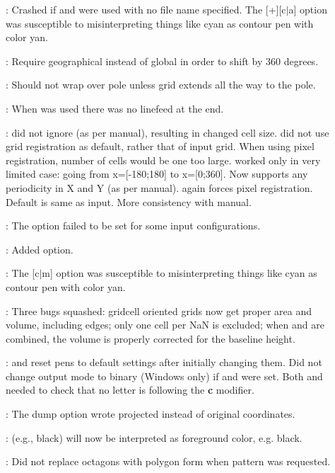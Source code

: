 \begin{description}
\item []: Crashed if  and  were used with no file name specified.
The [+][c$|$a] option was susceptible to misinterpreting things like cyan as contour pen with color yan.
\item []: Require geographical instead of global in order to shift by 360 degrees.
\item []: Should not wrap over pole unless grid extends all the way to the pole.
\item []: When  was used there was no linefeed at the end.
\item []:  did not ignore  (as per manual), resulting in changed cell size.
 did not use grid registration as default, rather that of input grid.
When using pixel registration, number of cells would be one too large.
 worked only in very limited case: going from x=[-180;180] to x=[0;360].
Now supports any periodicity in X and Y (as per manual).  again forces pixel registration.
Default is same as input.  More consistency with manual.
\item []: The  option failed to be set for some input configurations.
\item []: Added  option.
\item []: The [c$|$m] option was susceptible to misinterpreting things like cyan as contour pen with color yan.
\item []: Three bugs squashed: gridcell oriented grids now get proper area and volume,
including edges; only one cell per NaN is excluded; when  and  are combined,
the volume is properly corrected for the baseline height.
\item []:  and  reset pens to default settings after initially changing them.
Did not change output mode to binary (Windows only) if  and  were set.
Both  and  needed to check that no letter is following the {\bf c} modifier.
\item []: The  dump option wrote projected instead of original coordinates.
\item []:  (e.g., black) will now be interpreted as foreground color, e.g. black.
\item []: Did not replace octagons with polygon form when pattern was requested.

\end{description}
